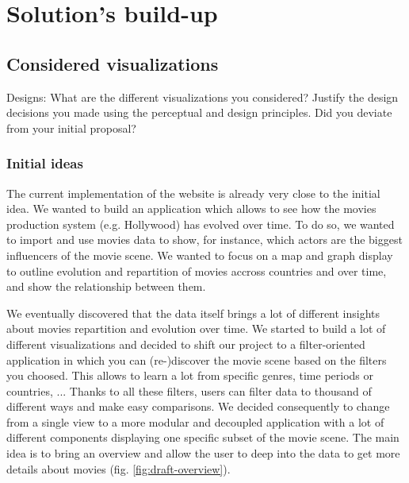\documentclass[a4paper,10pt]{article}
\begin{document}
\section{Solution's build-up}

\subsection{Considered visualizations}

Designs: What are the different visualizations you considered? Justify the design decisions you made using the perceptual and design principles.
Did you deviate from your initial proposal?

\subsubsection{Initial ideas}

The current implementation of the website is already very close to the initial idea.
We wanted to build an application which allows to see how the movies production
system (e.g. Hollywood) has evolved over time. To do so, we wanted to import and
use movies data to show, for instance, which actors are the biggest influencers of
the movie scene. We wanted to focus on a map and graph display to outline evolution
and repartition of movies accross countries and over time, and show the relationship between
them.

We eventually discovered that the data itself brings a lot of different insights
about movies repartition and evolution over time. We started to build a lot of different
visualizations and decided to shift our project to a filter-oriented application
in which you can (re-)discover the movie scene based on the filters you choosed.
This allows to learn a lot from specific genres, time periods or countries, ...
Thanks to all these filters, users can filter data to thousand of different
ways and make easy comparisons. We decided consequently to change from a single
view to a more modular and decoupled application with a lot of different components
displaying one specific subset of the movie scene. The main idea is to bring an
overview and allow the user to deep into the data to get more details about movies (fig. \ref{fig:draft-overview}).
\end{document}
